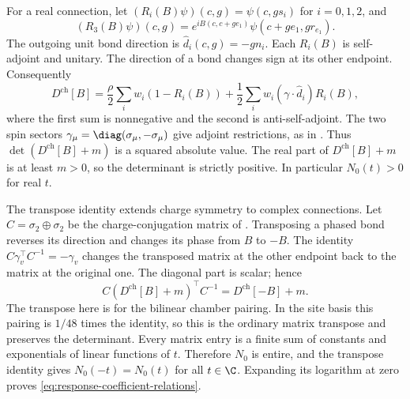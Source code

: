 \documentclass[11pt,letterpaper,reqno]{amsart}
\begin{document}
For a real connection, let
$(R_i(B)\psi)(c,g)=\psi(c,gs_i)$ for $i=0,1,2$, and
\[
 (R_3(B)\psi)(c,g)=e^{iB(c,c+ge_1)}
                         \psi(c+ge_1,gr_{e_1}).
\]
The outgoing unit bond direction is $\widehat d_i(c,g)=-gn_i$.
Each $R_i(B)$ is self-adjoint and unitary. The direction of a bond changes
sign at its other endpoint. Consequently
\[
 D^{\mathrm{ch}}[B]=\frac{\rho}{2}
       \sum_iw_i(1-R_i(B))+\frac12
       \sum_iw_i(\gamma\cdot\widehat d_i)R_i(B),
\]
where the first sum is nonnegative and the second is anti-self-adjoint.
The two spin sectors $\gamma_\mu=\diag(\sigma_\mu,-\sigma_\mu)$
give adjoint restrictions, as in \cite[(17)]{ChamberLattice}. Thus
$\det(D^{\mathrm{ch}}[B]+m)$ is a squared absolute value.
The real part of $D^{\mathrm{ch}}[B]+m$ is at least $m>0$,
so the determinant is strictly
positive. In particular $N_0(t)>0$ for real $t$.

The transpose identity extends charge symmetry to complex connections.
Let $C=\sigma_2\oplus\sigma_2$ be the charge-conjugation matrix of
\cite[\S3.1]{ChamberLattice}. Transposing a phased bond reverses its
direction and changes its phase from $B$ to $-B$.
The identity $C\gamma_v^\top C^{-1}=-\gamma_v$ changes the transposed
matrix at the other endpoint back to the matrix at the original one.
The diagonal part is scalar; hence
\[
 C(D^{\mathrm{ch}}[B]+m)^\top C^{-1}
                   =D^{\mathrm{ch}}[-B]+m.
\]
The transpose here is for the bilinear chamber pairing. In the site
basis this pairing is $1/48$ times the identity, so this is the
ordinary matrix transpose and preserves the determinant. Every matrix
entry is a finite sum of constants and exponentials of linear
functions of $t$. Therefore $N_0$ is entire, and the transpose
identity gives $N_0(-t)=N_0(t)$ for all $t\in\C$.
Expanding its logarithm at zero proves
\eqref{eq:response-coefficient-relations}.
\end{document}
